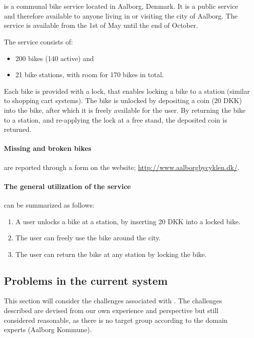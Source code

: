 \section{\citybike}\label{aalborg_bycyklen}
\citybike is a communal bike service located in Aalborg, Denmark.
It is a public service and therefore available to anyone living in or visiting the city of Aalborg.
The service is available from the 1st of May until the end of October.\cite{aalborgbycyklenbagcyklen}

\noindent The service consists of:
\begin{itemize}
\item 200 bikes (140 active) and 
\item 21 bike stations, with room for 170 bikes in total.
\end{itemize}
Each bike is provided with a lock, that enables locking a bike to a station (similar to shopping cart systems).
The bike is unlocked by depositing a coin (20 DKK) into the bike, after which it is freely available for the user.
By returning the bike to a station, and re-applying the lock at a free stand, the deposited coin is returned.

\paragraph{Missing and broken bikes} are reported through a form on the \citybike website; \url{http://www.aalborgbycyklen.dk/}.

\paragraph{The general utilization of the service} can be summarized as follows:
\begin{enumerate}
\item A user unlocks a bike at a station, by inserting 20 DKK into a locked bike.
\item The user can freely use the bike around the city.
\item The user can return the bike at any station by locking the bike.
\end{enumerate}

\subsection{Problems in the current system} \label{aalborg_bycyklen:challenges}
This section will consider the challenges associated with \citybike.
The challenges described are devised from our own experience and perspective but still considered reasonable, as there is no target group according to the domain experts (Aalborg Kommune).

